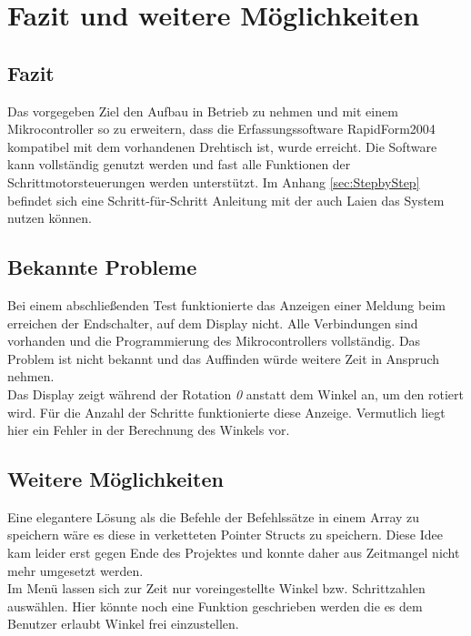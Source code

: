 \chapter{Fazit und weitere Möglichkeiten}
\label{cha:Fazit}
\section{Fazit}
Das vorgegeben Ziel den Aufbau in Betrieb zu nehmen und mit einem Mikrocontroller so zu erweitern, dass die Erfassungssoftware RapidForm2004 kompatibel mit dem vorhandenen Drehtisch ist, wurde erreicht. Die Software kann vollständig genutzt werden und fast alle Funktionen der Schrittmotorsteuerungen werden unterstützt. Im Anhang \ref{sec:StepbyStep} befindet sich eine Schritt-für-Schritt Anleitung mit der auch Laien das System nutzen können.
\section{Bekannte Probleme}
Bei einem abschließenden Test funktionierte das Anzeigen einer Meldung beim erreichen der Endschalter, auf dem Display nicht. Alle Verbindungen sind vorhanden und die Programmierung des Mikrocontrollers vollständig. Das Problem ist nicht bekannt und das Auffinden würde weitere Zeit in Anspruch nehmen.\\
Das Display zeigt während der Rotation \emph{0} anstatt dem Winkel an, um den rotiert wird. Für die Anzahl der Schritte funktionierte diese Anzeige. Vermutlich liegt hier ein Fehler in der Berechnung des Winkels vor.
\section{Weitere Möglichkeiten}
Eine elegantere Lösung als die Befehle der Befehlssätze in einem Array zu speichern wäre es diese in verketteten Pointer Structs zu speichern. Diese Idee kam leider erst gegen Ende des Projektes und konnte daher aus Zeitmangel nicht mehr umgesetzt werden.\\
Im Menü lassen sich zur Zeit nur voreingestellte Winkel bzw. Schrittzahlen auswählen. Hier könnte noch eine Funktion geschrieben werden die es dem Benutzer erlaubt Winkel frei einzustellen.
